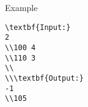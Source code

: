 Example
\begin{verbatim}
\textbf{Input:}
2
\\100 4
\\110 3
\\
\\\textbf{Output:}
-1
\\105 \end{verbatim}
